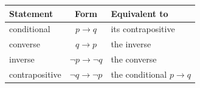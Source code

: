 \begin{center}
\renewcommand{\arraystretch}{1.35}
\begin{tabular}{l c l}
\toprule
\textbf{Statement} & \textbf{Form} & \textbf{Equivalent to} \\
\midrule
conditional & $p \rightarrow q$ & its contrapositive \\
converse & $q \rightarrow p$ & the inverse \\
inverse & $\neg p \rightarrow \neg q$ & the converse \\
contrapositive & $\neg q \rightarrow \neg p$ & the conditional $p \rightarrow q$ \\
\bottomrule
\end{tabular}
\end{center}
